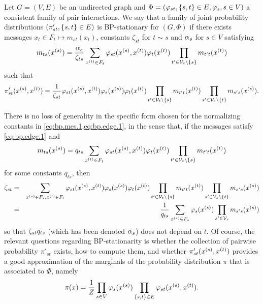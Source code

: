 \begin{definition}
\label{def:BP.stat}
Let $G=(V, E)$ be an undirected graph and $\Phi = (\varphi_{st},
\left\{ s,t \right\}\in E, \varphi_s, s\in V)$ a consistent family of pair interactions. We say that a family of joint
probability distributions $(\pi'_{st}, \left\{ s,t \right\}\in E)$ is
BP-stationary for $(G,\Phi)$ if there exists messages $x_t\in F_t
\mapsto m_{st}(x_t)$, constants $\zeta_{st}$ for $t\sim s$ and $\alpha_s$ for
$s\in V$  
satisfying
\begin{equation}
\label{eq:bp.mes.1}
m_{ts}(x^{(s)}) = \frac{\alpha_s}{\zeta_{ts}} \sum_{x^{(t)}\in F_{t}} \varphi_{st}(x^{(s)}, x^{(t)}) \varphi_t(x^{(t)}) \prod_{t'\in{\mathcal V}_t\setminus \{s\}} m_{t't}(x^{(t)})
\end{equation}
 such that
\begin{equation}
\label{eq:bp.edge.1}
\pi'_{st}(x^{(s)}, x^{(t)}) 
=  \frac{1}{\zeta_{st}} \varphi_{st}(x^{(s)}, x^{(t)}) \varphi_s(x^{(s)})
\varphi_t(x^{(t)}) \prod_{t'\in{\mathcal V}_t\setminus \{s\}} m_{t't}(x^{(t)}) \prod_{s'\in{\mathcal V}_s\setminus \{t\}} m_{s's}(x^{(s)}).
\end{equation}
\end{definition}
There is no loss  of generality in the specific form chosen for the normalizing
constants in \cref{eq:bp.mes.1,eq:bp.edge.1}, in the
sense that, if the messages satisfy \cref{eq:bp.edge.1} and
\[
m_{ts}(x^{(s)}) = q_{ts} \sum_{x^{(t)}\in F_{t}} \varphi_{st}(x^{(s)}, x^{(t)}) \varphi_t(x^{(t)}) \prod_{t'\in{\mathcal V}_t\setminus \{s\}} m_{t't}(x^{(t)})
\]
for some constants $q_{ts}$, then
 \begin{eqnarray*}
\zeta_{st} &=& \sum_{x^{(s)} \in F_s, x^{(t)}\in F_t} \varphi_{st}(x^{(s)}, x^{(t)}) \varphi_s(x^{(s)})
\varphi_t(x^{(t)}) \prod_{t'\in{\mathcal V}_t\setminus \{s\}} m_{t't}(x^{(t)})
\prod_{s'\in{\mathcal V}_s\setminus \{t\}} m_{s's}(x^{(s)})\\
 &=& \frac{1}{q_{ts}} \sum_{x^{(s)}\in F_s} 
\varphi_s(x^{(s)}) \prod_{s'\in{\mathcal V}_s} m_{s's}(x^{(s)})
\end{eqnarray*}
so that $\zeta_{st}q_{ts}$ (which has been denoted $\alpha_s$) does not
depend on $t$.
Of course, the relevant questions regarding BP-stationarity is whether
the collection of pairwise probability $\pi'_{st}$ exists, how to compute them, and whether $\pi'_{st}(x^{(s)}, x^{(t)})$
provides a good approximation of the marginals of the probability
distribution $\pi$ that is associated to $\Phi$, namely 
\[
\pi(x) = \frac{1}{Z} \prod_{s\in V} \varphi_s(x^{(s)}) \prod_{\left\{ s,t \right\}\in E} \varphi_{st}(x^{(s)}, x^{(t)}).
\]

